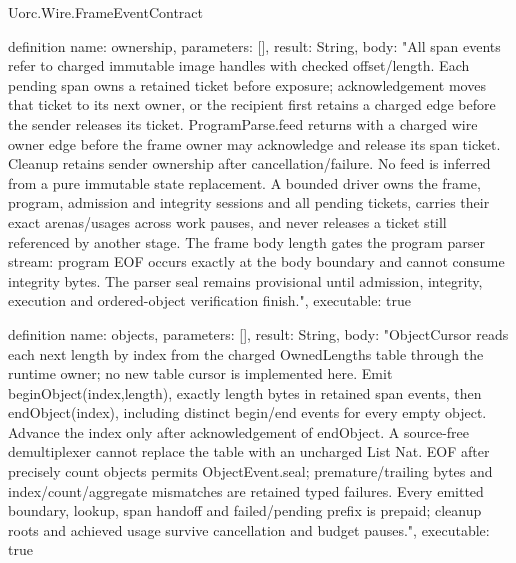 \begin{lexlean}{Uorc.Wire.FrameEventContract}
\begin{semanticmodule}
definition{
  name: ownership,
  parameters: [],
  result: String,
  body: "All span events refer to charged immutable image handles with checked offset/length. Each pending span owns a retained ticket before exposure; acknowledgement moves that ticket to its next owner, or the recipient first retains a charged edge before the sender releases its ticket. ProgramParse.feed returns with a charged wire owner edge before the frame owner may acknowledge and release its span ticket. Cleanup retains sender ownership after cancellation/failure. No feed is inferred from a pure immutable state replacement. A bounded driver owns the frame, program, admission and integrity sessions and all pending tickets, carries their exact arenas/usages across work pauses, and never releases a ticket still referenced by another stage. The frame body length gates the program parser stream: program EOF occurs exactly at the body boundary and cannot consume integrity bytes. The parser seal remains provisional until admission, integrity, execution and ordered-object verification finish.",
  executable: true
}

definition{
  name: objects,
  parameters: [],
  result: String,
  body: "ObjectCursor reads each next length by index from the charged OwnedLengths table through the runtime owner; no new table cursor is implemented here. Emit beginObject(index,length), exactly length bytes in retained span events, then endObject(index), including distinct begin/end events for every empty object. Advance the index only after acknowledgement of endObject. A source-free demultiplexer cannot replace the table with an uncharged List Nat. EOF after precisely count objects permits ObjectEvent.seal; premature/trailing bytes and index/count/aggregate mismatches are retained typed failures. Every emitted boundary, lookup, span handoff and failed/pending prefix is prepaid; cleanup roots and achieved usage survive cancellation and budget pauses.",
  executable: true
}


\end{semanticmodule}
\end{lexlean}
